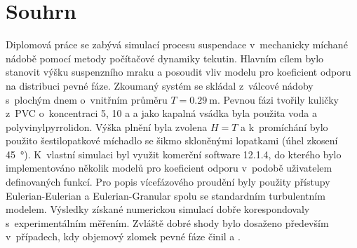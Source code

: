 \section*{Souhrn}
Diplomová práce se zabývá simulací procesu suspendace v~mechanicky míchané nádobě pomocí metody počítačové dynamiky tekutin. Hlavním cílem bylo stanovit výšku sus\-pen\-zní\-ho mraku a posoudit vliv modelu pro koeficient odporu na distribuci pevné fáze. Zkoumaný systém se skládal z~válcové nádoby s~plochým dnem o~vnitřním průměru $T=\SI{0.29}{\meter}$. Pevnou fázi tvořily kuličky z~PVC o~koncentraci 5, 10 a  a jako kapalná vsádka byla použita voda a polyvinylpyrrolidon. Výška plnění byla zvolena $H=T$ a k~promíchání bylo použito šestilopatkové míchadlo se šikmo skloněnými lopatkami (úhel zkosení \SI{45}{\degree}). K~vlastní simulaci byl využit komerční software \flu{} 12.1.4, do kterého bylo implementováno několik modelů pro koeficient odporu v~podobě uživatelem definovaných funkcí. Pro popis vícefázového proudění byly použity přístupy Eulerian-Eulerian a Eulerian-Granular spolu se standardním \keps{} turbulentním modelem. Výsledky získané numerickou simulací dobře korespondovaly s~experimentálním měřením. Zvláště dobré shody bylo dosaženo především v~případech, kdy objemový zlomek pevné fáze činil  a .
